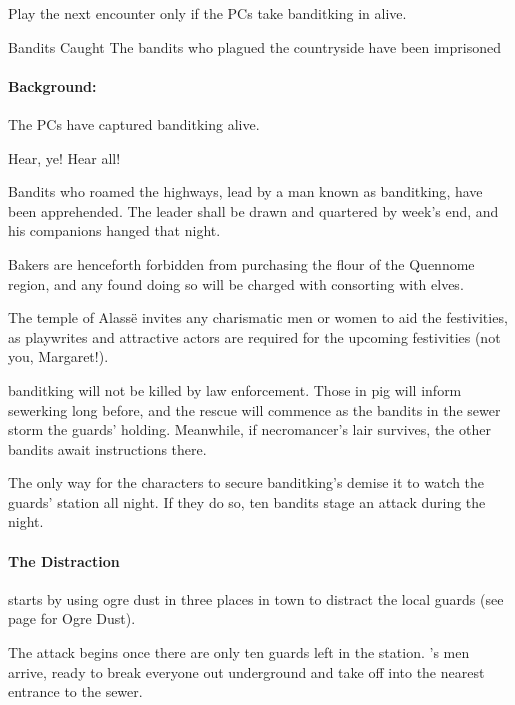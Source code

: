 \begin{multicols}{2}
\banditking


Play the next encounter only if the PCs take \gls{banditking} in alive.

\resumecontents[Town]

{Bandits Caught}%
{The bandits who plagued the countryside have been imprisoned}%

\stopcontents[Town]

\paragraph{Background:}
The PCs have captured \gls{banditking} alive.

\begin{boxtext}

  Hear, ye!  Hear all!

  Bandits who roamed the highways, lead by a man known as \gls{banditking}, have been apprehended.  The leader shall be drawn and quartered by week's end, and his companions hanged that night.

  Bakers are henceforth forbidden from purchasing the flour of the Quennome region, and any found doing so will be charged with consorting with elves.

  The temple of Alass\"e invites any charismatic men or women to aid the festivities, as playwrites and attractive actors are required for the upcoming festivities (not you, Margaret!).

\end{boxtext}

\Gls{banditking} will not be killed by law enforcement.
Those in \gls{pig} will inform \gls{sewerking} long before, and the rescue will commence as the bandits in the sewer storm the guards' holding.
Meanwhile, if \gls{necromancer}'s lair survives, the other bandits await instructions there.


The only way for the characters to secure \gls{banditking}'s demise it to watch the guards' station all night.
If they do so, ten bandits stage an attack during the night.

\paragraph{The Distraction} starts by using ogre dust in three places in town to distract the local guards (see page \pageref{ogredust} for Ogre Dust).

The attack begins once there are only ten guards left in the station.
's men arrive, ready to break everyone out underground and take off into the nearest entrance to the sewer.

\stopcontents[sq]

\stopcontents[Villages]

\end{multicols}
